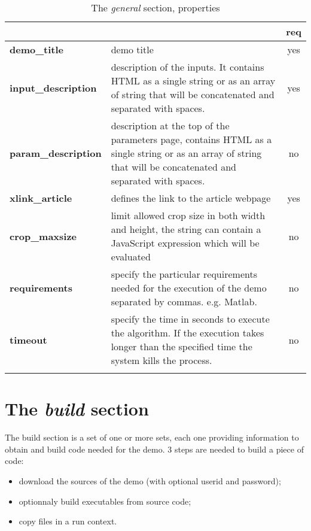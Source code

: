 % 
\begin{longtable}{|>{\bf}L{\linewidth}|L{\linewidth}|c|}
\hline
      &  & {\bf req} 
\tabularnewline \hline \hline
 demo\_title         & demo title & yes\\ \hline
 input\_description  & description of the inputs. 
                      It contains HTML as a single string or as an array of string
                      that will be concatenated and separated with spaces.
                     & yes \\ \hline
 param\_description  & description at the top of the para\-meters page,
                      contains HTML as a single string or as an array of string
                      that will be concatenated and separated with spaces.
                      & no
                      \\ \hline
 xlink\_article     & defines the link to the article webpage & yes  \\ \hline
 crop\_maxsize      & limit allowed crop size in both width and height, the string
                      can contain a JavaScript expression which will be evaluated & no \\ \hline
 requirements 	    & specify the particular requirements needed for the execution of the demo separated by commas. e.g. Matlab. & no \\ \hline
 timeout 	    & specify the time in seconds to execute the algorithm. If the execution takes longer than the specified time 
		      the system kills the process.& no \\ \hline
\caption{The \emph{general} section, properties}
\end{longtable}

\section{The \emph{build} section}

The build section is a set of one or more sets,
each one providing information to obtain and build code needed for the demo.
3 steps are needed to build a piece of code: 

\begin{itemize}
  \item download the sources of the demo (with optional userid and password);
  \item optionnaly build executables from source code;
  \item copy files in a run context.
\end{itemize}



